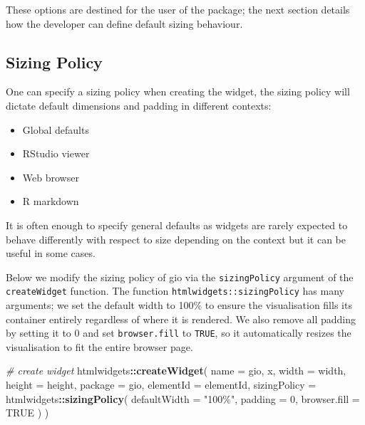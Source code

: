 \documentclass[
  10pt,
]{krantz}
\makeatletter
\newenvironment{Shaded}{\begin{snugshade}}{\end{snugshade}}
\newcommand{\CommentTok}[1]{\textcolor[rgb]{0.37,0.37,0.37}{\textit{#1}}}
\newcommand{\DataTypeTok}[1]{\textcolor[rgb]{0.27,0.27,0.27}{#1}}
\newcommand{\DecValTok}[1]{\textcolor[rgb]{0.06,0.06,0.06}{#1}}
\newcommand{\KeywordTok}[1]{\textcolor[rgb]{0.27,0.27,0.27}{\textbf{#1}}}
\newcommand{\NormalTok}[1]{#1}
\newcommand{\OperatorTok}[1]{\textcolor[rgb]{0.43,0.43,0.43}{\textbf{#1}}}
\newcommand{\OtherTok}[1]{\textcolor[rgb]{0.37,0.37,0.37}{#1}}
\newcommand{\StringTok}[1]{\textcolor[rgb]{0.5,0.5,0.5}{#1}}
\providecommand{\tightlist}{%
  \setlength{\itemsep}{0pt}\setlength{\parskip}{0pt}}
\newenvironment{kframe}{%
\medskip{}
\setlength{\fboxsep}{.8em}
 \def\at@end@of@kframe{}%
 \ifinner\ifhmode%
  \def\at@end@of@kframe{\end{minipage}}%
  \begin{minipage}{\columnwidth}%
 \fi\fi%
 \def\FrameCommand##1{\hskip\@totalleftmargin \hskip-\fboxsep
 \colorbox{shadecolor}{##1}\hskip-\fboxsep
     \hskip-\linewidth \hskip-\@totalleftmargin \hskip\columnwidth}%
 \MakeFramed {\advance\hsize-\width
   \@totalleftmargin\z@ \linewidth\hsize
   \@setminipage}}%
 {\par\unskip\endMakeFramed%
 \at@end@of@kframe}
\renewenvironment{Shaded}{\begin{kframe}}{\end{kframe}}
\makeatother
\begin{document}
These options are destined for the user of the package; the next section details how the developer can define default sizing behaviour.

\hypertarget{widgets-adv-sizing-policy}{%
\subsection{Sizing Policy}\label{widgets-adv-sizing-policy}}

One can specify a sizing policy when creating the widget, the sizing policy will dictate default dimensions and padding in different contexts:

\begin{itemize}
\tightlist
\item
  Global defaults
\item
  RStudio viewer
\item
  Web browser
\item
  R markdown
\end{itemize}

It is often enough to specify general defaults as widgets are rarely expected to behave differently with respect to size depending on the context but it can be useful in some cases.

Below we modify the sizing policy of gio via the \texttt{sizingPolicy} argument of the \texttt{createWidget} function. The function \texttt{htmlwidgets::sizingPolicy} has many arguments; we set the default width to 100\% to ensure the visualisation fills its container entirely regardless of where it is rendered. We also remove all padding by setting it to 0 and set \texttt{browser.fill} to \texttt{TRUE}, so it automatically resizes the visualisation to fit the entire browser page.

\begin{Shaded}
\begin{Highlighting}[]
\CommentTok{\# create widget}
\NormalTok{htmlwidgets}\OperatorTok{::}\KeywordTok{createWidget}\NormalTok{(}
  \DataTypeTok{name =} \StringTok{\textquotesingle{}gio\textquotesingle{}}\NormalTok{,}
\NormalTok{  x,}
  \DataTypeTok{width =}\NormalTok{ width,}
  \DataTypeTok{height =}\NormalTok{ height,}
  \DataTypeTok{package =} \StringTok{\textquotesingle{}gio\textquotesingle{}}\NormalTok{,}
  \DataTypeTok{elementId =}\NormalTok{ elementId,}
  \DataTypeTok{sizingPolicy =}\NormalTok{ htmlwidgets}\OperatorTok{::}\KeywordTok{sizingPolicy}\NormalTok{(}
    \DataTypeTok{defaultWidth =} \StringTok{"100\%"}\NormalTok{,}
    \DataTypeTok{padding =} \DecValTok{0}\NormalTok{,}
    \DataTypeTok{browser.fill =} \OtherTok{TRUE}
\NormalTok{  )}
\NormalTok{)}
\end{Highlighting}
\end{Shaded}
\end{document}
